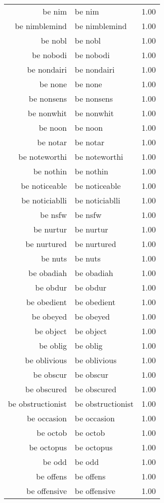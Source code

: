 \begin{table}[ht]
\begin{tabular}{rlr}
  be nim & be nim & 1.00 \\ 
  be nimblemind & be nimblemind & 1.00 \\ 
  be nobl & be nobl & 1.00 \\ 
  be nobodi & be nobodi & 1.00 \\ 
  be nondairi & be nondairi & 1.00 \\ 
  be none & be none & 1.00 \\ 
  be nonsens & be nonsens & 1.00 \\ 
  be nonwhit & be nonwhit & 1.00 \\ 
  be noon & be noon & 1.00 \\ 
  be notar & be notar & 1.00 \\ 
  be noteworthi & be noteworthi & 1.00 \\ 
  be nothin & be nothin & 1.00 \\ 
  be noticeable & be noticeable & 1.00 \\ 
  be noticiablli & be noticiablli & 1.00 \\ 
  be nsfw & be nsfw & 1.00 \\ 
  be nurtur & be nurtur & 1.00 \\ 
  be nurtured & be nurtured & 1.00 \\ 
  be nuts & be nuts & 1.00 \\ 
  be obadiah & be obadiah & 1.00 \\ 
  be obdur & be obdur & 1.00 \\ 
  be obedient & be obedient & 1.00 \\ 
  be obeyed & be obeyed & 1.00 \\ 
  be object & be object & 1.00 \\ 
  be oblig & be oblig & 1.00 \\ 
  be oblivious & be oblivious & 1.00 \\ 
  be obscur & be obscur & 1.00 \\ 
  be obscured & be obscured & 1.00 \\ 
  be obstructionist & be obstructionist & 1.00 \\ 
  be occasion & be occasion & 1.00 \\ 
  be octob & be octob & 1.00 \\ 
  be octopus & be octopus & 1.00 \\ 
  be odd & be odd & 1.00 \\ 
  be offens & be offens & 1.00 \\ 
  be offensive & be offensive & 1.00 \\ 

\end{tabular}
\end{table}
